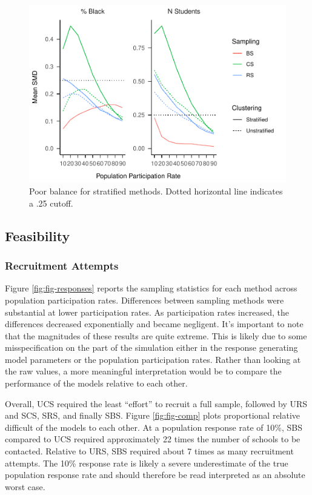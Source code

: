 \documentclass[man,floatsintext]{apa6}
\begin{document}
\begin{figure}
\centering
\includegraphics{GenSamp-Paper_files/figure-latex/fig-SMD-by-Var-bad-1.pdf}
\caption{\label{fig:fig-SMD-by-Var-bad}Poor balance for stratified methods. Dotted horizontal line indicates a .25 cutoff.}
\end{figure}

\hypertarget{feasibility-1}{%
\subsection{Feasibility}\label{feasibility-1}}

\hypertarget{recruitment-attempts}{%
\subsubsection{Recruitment Attempts}\label{recruitment-attempts}}

Figure \ref{fig:fig-responses} reports the sampling statistics for each method across population participation rates. Differences between sampling methods were substantial at lower participation rates. As participation rates increased, the differences decreased exponentially and became negligent. It's important to note that the magnitudes of these results are quite extreme. This is likely due to some misspecification on the part of the simulation either in the response generating model parameters or the population participation rates. Rather than looking at the raw values, a more meaningful interpretation would be to compare the performance of the models relative to each other.

Overall, UCS required the least \enquote{effort} to recruit a full sample, followed by URS and SCS, SRS, and finally SBS. Figure \ref{fig:fig-comp} plots proportional relative difficult of the models to each other. At a population response rate of 10\%, SBS compared to UCS required approximately 22 times the number of schools to be contacted. Relative to URS, SBS required about 7 times as many recruitment attempts. The 10\% response rate is likely a severe underestimate of the true population response rate and should therefore be read interpreted as an absolute worst case.
\end{document}
